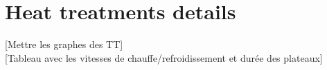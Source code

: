 
\chapter{Heat treatments details} %

\label{AppendixTT} %

[Mettre les graphes des TT]\\

[Tableau avec les vitesses de chauffe/refroidissement et durée des plateaux]